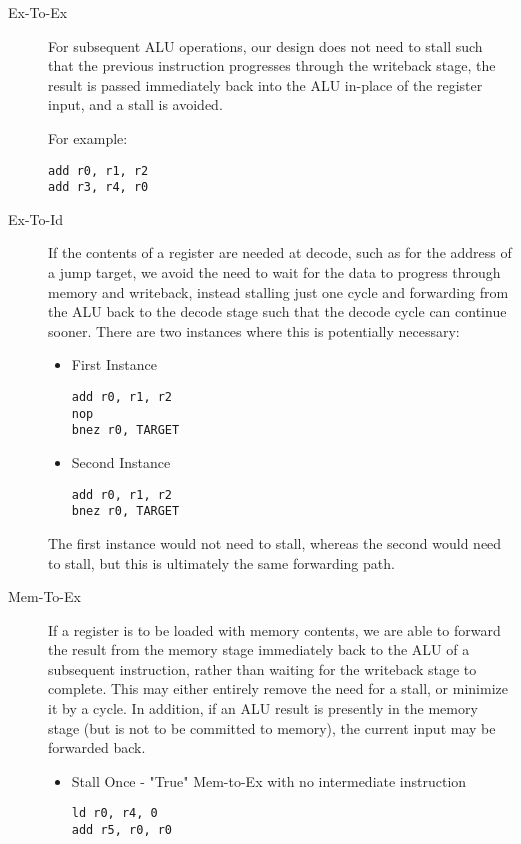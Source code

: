 \documentclass[11pt]{article}
\begin{document}
\begin{description}
\item[{Ex-To-Ex}] For subsequent ALU operations, our design does not
need to stall such that the previous instruction progresses
through the writeback stage, the result is passed immediately
back into the ALU in-place of the register input, and a stall is
avoided.

For example:

\begin{verbatim}
add r0, r1, r2
add r3, r4, r0
\end{verbatim}

\item[{Ex-To-Id}] If the contents of a register are needed at decode,
such as for the address of a jump target, we avoid the need to
wait for the data to progress through memory and writeback,
instead stalling just one cycle and forwarding from the ALU back
to the decode stage such that the decode cycle can continue
sooner. There are two instances where this is potentially necessary:

\begin{itemize}
\item First Instance
\begin{verbatim}
add r0, r1, r2
nop
bnez r0, TARGET
\end{verbatim}

\item Second Instance
\begin{verbatim}
add r0, r1, r2
bnez r0, TARGET
\end{verbatim}
\end{itemize}

The first instance would not need to stall, whereas the second
would need to stall, but this is ultimately the same forwarding path.

\item[{Mem-To-Ex}] If a register is to be loaded with memory contents,
we are able to forward the result from the memory stage
immediately back to the ALU of a subsequent instruction, rather
than waiting for the writeback stage to complete. This may
either entirely remove the need for a stall, or minimize it by a
cycle. In addition, if an ALU result is presently in the memory
stage (but is not to be committed to memory), the current input
may be forwarded back.

\begin{itemize}
\item Stall Once - "True" Mem-to-Ex with no intermediate instruction
\begin{verbatim}
ld r0, r4, 0
add r5, r0, r0
\end{verbatim}


\end{itemize}
\end{description}
\end{document}
